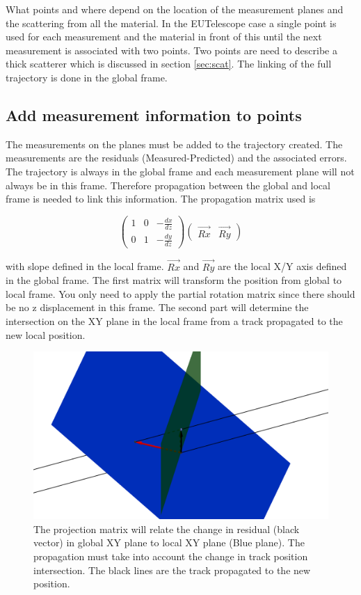 What points and where depend on the location of the measurement planes and the scattering from all the material. In the EUTelescope case a single point is used for each measurement and the material in front of this until the next measurement is associated with two points. Two points are need to describe a thick scatterer which is discussed in section \ref{sec:scat}. The linking of the full trajectory is done in the global frame.

\subsection{Add measurement information to points}

The measurements on the planes must be added to the trajectory created. The measurements are the residuals (Measured-Predicted) and the associated errors. The trajectory is always in the global frame and each measurement plane will not always be in this frame. Therefore propagation between the global and local frame is needed to link this information.
The propagation matrix used is

\[ 
\left( \begin{array}{ccc}
1  & 0   & -\frac{dx}{dz}   \\
0   & 1  & -\frac{dy}{dz}  
  \label{eq:prop}
\end{array}
 \right)
  \left( \begin{array}{cc}
 \overrightarrow{Rx}  &  \overrightarrow{Ry}  
\end{array}
 \right)
 \] 
 
 with slope defined in the local frame.  $\overrightarrow{Rx}$ and  $\overrightarrow{Ry}$ are the local X/Y axis defined in the global frame. The first matrix will transform the position from global to local frame. You only need to apply the partial rotation matrix since there should be no z displacement in this frame. The second part will determine the intersection on the XY plane in the local frame from a track propagated to the new local position.
 
 \begin{figure}[H]
\centering
\includegraphics[width=1.0\linewidth]{figures/prop.png}
\caption{The projection matrix will relate the change in residual (black vector) in global XY plane to local XY plane (Blue plane). The propagation must take into account the change in track position intersection. The black lines are the track propagated to the new position.}
\label{fig:Prop}
\end{figure}
 
